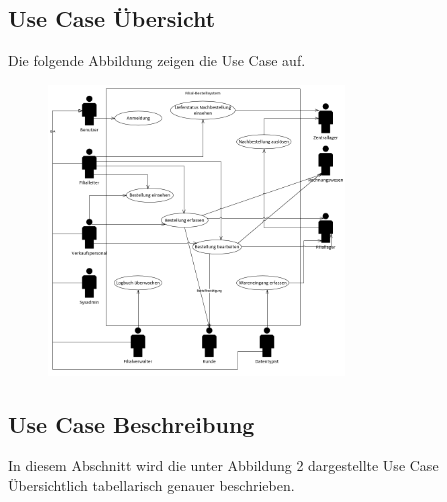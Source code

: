 \subsection{Use Case Übersicht}
Die folgende Abbildung zeigen die Use Case auf.

\begin{figure}[H]%
\centering
\includegraphics[width=0.7\textwidth]{Images/usecase-u.png}
\label{fig:usecase}
\end{figure}


\subsection{Use Case Beschreibung}
In diesem Abschnitt wird die unter Abbildung 2 dargestellte Use Case Übersichtlich tabellarisch genauer beschrieben.











